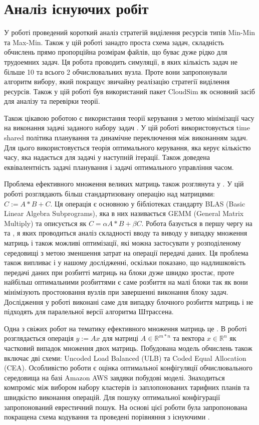 \section{Аналіз існуючих робіт}

У роботі \cite{AppSelAlgoFEffResProvInCloud} проведений короткий аналіз стратегій виділення ресурсів типів Min-Min та Max-Min. Також у цій роботі занадто проста схема задач, складність обчислень прямо пропорційна розмірам файлів, що буває дуже рідко для трудоемних задач. Ця робота проводить симуляції, в яких кількість задач не більше 10 та всього 2 обчислювальних вузла. Проте вони запропонували алгоритм вибору, який покращує звичайну реалізацію стратегії виділення ресурсів. Також у цій роботі був використаний пакет CloudSim як основний засіб для аналізу та перевірки теорії.

Також цікавою роботою є використання теорії керування з метою мінімізації часу на виконання задачі заданого набору задач \cite{Prasanna1991GeneralisedMS}. У цій роботі використовується time shared політика планування та динамічне переключення між виконанням задач. Для цього використовується теорія оптимального керування, яка керує кількістю часу, яка надається для задачі у наступній ітерації. Також доведена еквівалентність задачі планування і задачі оптимального управління часом.

Проблема ефективного множення великих матриць також розглянута у \cite{PushingTheBoundsOfMatrixMatrix}. У цій роботі розглядають більш стандартизовану операцію над матрицями: $C := A*B + C$. Ця операція є основною у бібліотеках стандарту BLAS (Basic Linear Algebra Subprograms), яка в них називається GEMM (General Matrix Multiply) та описується як $C = \alpha A*B + \beta C$. Робота базується в першу чергу на \cite{IOComplexityMatrixMatrix} та \cite{Irony}, я яких проводиться аналіз складності вводу та виводу у випадку множення матриць і також можливі оптимізації, які можна застосувати у розподіленому середовищі з метою зменшення затрат на операції передачі даних. Ця проблема також випливає і у нашому дослідженні, оскільки показано, що надлишковість передачі даних при розбитті матриць на блоки дуже швидко зростає, проте найбільш оптимальними розбиттями є саме розбиття на малі блоки так як вони мінімізують простоювання вузлів при завершенні виконання блоку задач. Дослідження у роботі виконані саме для випадку блочного розбиття матриць і не підходять для паралельної версії алгоритма Штрассена.

Одна з свіжих робот на тематику ефективного множення матриць це \cite{CodedHeterogeneousMatrixMatrix}. В роботі розглядається операція $y:=Ax$ для матриці $A \in \mathbb{R}^{m*n}$ та вектора $x \in \mathbb{R}^{n}$ як частковий випадок множення двох матриць. Побудована модель обчислень також включає дві схеми: Uncoded Load Balanced (ULB) та Coded Equal Allocation (CEA). Особливістю роботи є оцінка оптимальної конфігуляції обчислювального середовища на базі Amazon AWS завдяки побудові моделі. Знаходиться компроміс між вибором набору кластерів із заплопонованих тарифних планів та швидкістю виконання операцій. Для пошуку оптимальної конфігурації запропонований еврестичний пошук. На основі цієї роботи була запропонована покращена схема кодування та проведені порівняння з існуючими \cite{CodedHeterogeneousMatrixMatrix2}.